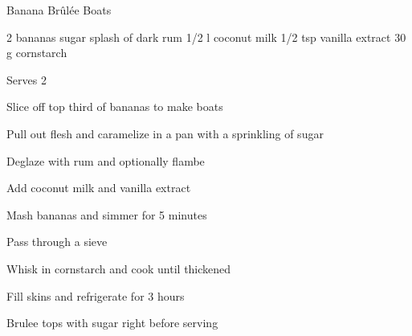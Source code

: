 \begin{denserecipe}{Banana Brûlée Boats}{\vegetarian{}}
\begin{ingredients}
2 bananas
sugar
splash of dark rum
1/2 l coconut milk
1/2 tsp vanilla extract
30 g cornstarch
\end{ingredients}
\nextcolumn
Serves 2
\begin{steps}
    \item Slice off top third of bananas to make boats
    \item Pull out flesh and caramelize in a pan with a sprinkling of sugar
    \item Deglaze with rum and optionally flambe
    \item Add coconut milk and vanilla extract
    \item Mash bananas and simmer for 5 minutes
    \item Pass through a sieve
    \item Whisk in cornstarch and cook until thickened
    \item Fill skins and refrigerate for 3 hours
    \item Brulee tops with sugar right before serving
\end{steps}
\end{denserecipe}
